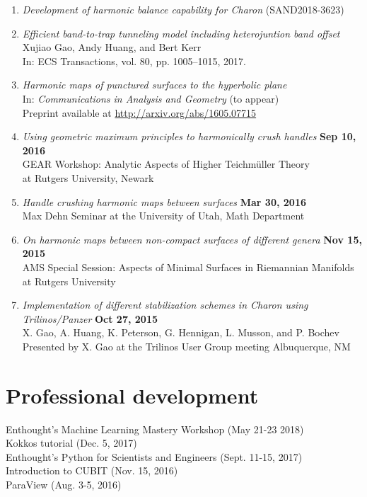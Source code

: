 \documentclass[margin,line]{res}
\begin{document}
\begin{resume}
\begin{enumerate}
\item \emph{Development of harmonic balance capability for Charon} (SAND2018-3623)
\item {\em Efficient band-to-trap tunneling model including heterojuntion band offset}\\
      Xujiao Gao, Andy Huang, and Bert Kerr\\
      In: ECS Transactions, vol. 80, pp. 1005–1015, 2017.
\item {\em Harmonic maps of punctured surfaces to the hyperbolic plane} \\%
      In: {\em Communications in Analysis and Geometry} (to appear) \\
      Preprint available at \url{http://arxiv.org/abs/1605.07715}
\item {\em Using geometric maximum principles to harmonically crush handles} \hfill {\bf Sep 10, 2016} \\
      GEAR Workshop: Analytic Aspects of Higher Teichm\"uller Theory\\
      at Rutgers University, Newark
\item {\em Handle crushing harmonic maps between surfaces} \hfill {\bf Mar 30, 2016} \\
      Max Dehn Seminar at the University of Utah, Math Department
\item {\em On harmonic maps between non-compact surfaces of different genera} \hfill {\bf Nov 15, 2015} \\
      AMS Special Session: Aspects of Minimal Surfaces in Riemannian Manifolds\\
      at Rutgers University
\item {\em Implementation of different stabilization schemes in Charon using Trilinos/Panzer} \hfill{ \bf Oct 27, 2015} \\
      X. Gao, A. Huang, K. Peterson, G. Hennigan, L. Musson, and P. Bochev \\
      Presented by X. Gao at the Trilinos User Group meeting Albuquerque, NM
\end{enumerate}

\section{\sc Professional development}
Enthought's Machine Learning Mastery Workshop (May 21-23 2018)\\
Kokkos tutorial (Dec. 5, 2017)\\
Enthought's Python for Scientists and Engineers (Sept. 11-15, 2017)\\
Introduction to CUBIT (Nov. 15, 2016)\\
ParaView (Aug. 3-5, 2016)


\end{resume}
\end{document}
